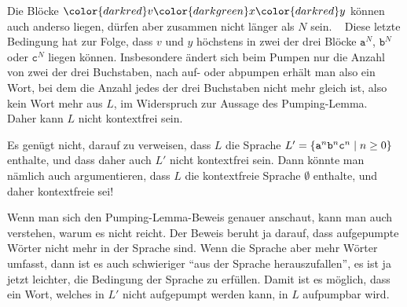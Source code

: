 \begin{loesung}
\begin{center}
\end{center}
Die Blöcke ${\color{darkred}v}{\color{darkgreen}x}{\color{darkred}y}$
können auch anderso liegen, dürfen aber zusammen nicht länger als $N$ sein.
~%
Diese letzte Bedingung hat zur Folge, dass $v$ und $y$ höchstens in
zwei der drei Blöcke $\texttt{a}^N$, $\texttt{b}^N$ oder $\texttt{c}^N$
liegen können.
Insbesondere ändert sich beim Pumpen nur die Anzahl von zwei der drei
Buchstaben, nach auf- oder abpumpen erhält man also ein Wort, bei dem 
die Anzahl jedes der drei Buchstaben nicht mehr gleich ist, also kein
Wort mehr aus $L$, im Widerspruch zur Aussage des Pumping-Lemma.
~%
Daher kann $L$ nicht kontextfrei sein.
\end{loesung}

\begin{diskussion}
Es genügt nicht, darauf zu verweisen, dass $L$ die Sprache
$L'
=
\{
\texttt{a}\mathstrut^n \texttt{b}\mathstrut^n \texttt{c}\mathstrut^n
\mid n\ge 0
\}$
enthalte, und dass daher auch $L'$ nicht kontextfrei sein.
Dann könnte man nämlich auch argumentieren, dass $L$ die kontextfreie Sprache
$\emptyset$ enthalte, und daher kontextfreie sei!

Wenn man sich den Pumping-Lemma-Beweis genauer anschaut, kann man auch verstehen,
warum es nicht reicht. Der Beweis beruht ja darauf, dass aufgepumpte Wörter nicht
mehr in der Sprache sind. Wenn die Sprache aber mehr Wörter umfasst, dann ist
es auch schwieriger ``aus der Sprache herauszufallen'', es ist ja jetzt leichter,
die Bedingung der Sprache zu erfüllen. Damit ist es möglich, dass ein Wort, welches
in $L'$ nicht aufgepumpt werden kann, in $L$ aufpumpbar wird.
\end{diskussion}

